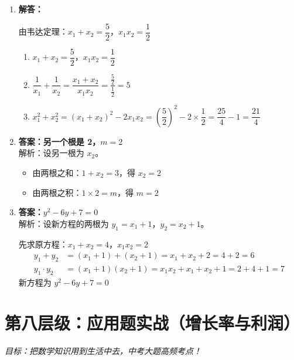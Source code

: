 \documentclass[12pt, a4paper]{article}
\begin{document}
\begin{answerbox}
    \begin{enumerate}
        \item \textbf{解答：}
        
        由韦达定理：$x_1 + x_2 = \dfrac{5}{2}$，$x_1 x_2 = \dfrac{1}{2}$
        \begin{enumerate}
            \item[(1)] $x_1 + x_2 = \dfrac{5}{2}$，$x_1 x_2 = \dfrac{1}{2}$
            
            \item[(2)] $\dfrac{1}{x_1} + \dfrac{1}{x_2} = \dfrac{x_1 + x_2}{x_1 x_2} = \dfrac{\frac{5}{2}}{\frac{1}{2}} = 5$
            
            \item[(3)] $x_1^2 + x_2^2 = (x_1 + x_2)^2 - 2x_1 x_2 = \left(\dfrac{5}{2}\right)^2 - 2 \times \dfrac{1}{2} = \dfrac{25}{4} - 1 = \dfrac{21}{4}$
        \end{enumerate}
        
        \item \textbf{答案：另一个根是 2，$m = 2$} \\
        解析：设另一根为 $x_2$。
        \begin{itemize}
            \item 由两根之和：$1 + x_2 = 3$，得 $x_2 = 2$
            \item 由两根之积：$1 \times 2 = m$，得 $m = 2$
        \end{itemize}
        
        \item \textbf{答案：$y^2 - 6y + 7 = 0$} \\
        解析：设新方程的两根为 $y_1 = x_1 + 1$，$y_2 = x_2 + 1$。
        
        先求原方程：$x_1 + x_2 = 4$，$x_1 x_2 = 2$
        \begin{align*}
            y_1 + y_2 &= (x_1 + 1) + (x_2 + 1) = x_1 + x_2 + 2 = 4 + 2 = 6 \\
            y_1 \cdot y_2 &= (x_1 + 1)(x_2 + 1) = x_1 x_2 + x_1 + x_2 + 1 = 2 + 4 + 1 = 7
        \end{align*}
        新方程为 $y^2 - 6y + 7 = 0$
    \end{enumerate}
\end{answerbox}

\section{第八层级：应用题实战（增长率与利润）}
\textit{目标：把数学知识用到生活中去，中考大题高频考点！}
\end{document}
